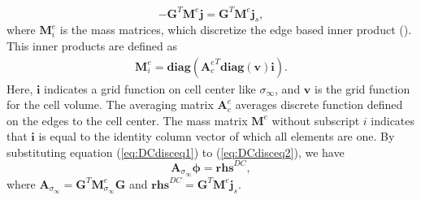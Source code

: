 \documentclass[a4paper, 11pt]{article}
\newcommand{\siginf}{\sigma_\infty}
\newcommand{\dgrad}{{\mathbf G}}
\newcommand{\Ace}{{\mathbf A_c^e}}
\newcommand{\diag}{\mathbf{diag}}
\newcommand{\M}{{\mathbf M}}
\newcommand{\MeSigInf}{{\M^e_{\sigma_\infty}}}
\newcommand{\Me}{{\M^e}}
\renewcommand {\dj}  { {\mathbf{j} } }
\newcommand{\vol}{\mathbf{v}}
\newcommand{\A}{\mathbf{A}}
\begin{document}
\begin{equation}
  -\dgrad^T \Me\dj = \dgrad^T \Me\dj_s,
  \label{eq:DCdisceq2}
\end{equation}
where $\mathbf{M}^e_i$ is the mass matrices, which discretize the edge based inner product (\cite{Eldadbook}). This inner products are defined  as
\begin{align}
  \mathbf{M}^e_i = \diag(\Ace^T\diag(\vol)\mathbf{i}).
\end{align}
Here, $\mathbf{i}$ indicates a grid function on cell center like $\siginf$, and $\vol$ is the grid function for the cell volume. The averaging matrix $\Ace$ averages discrete function defined on the edges to the cell center. The mass matrix $\Me$ without subscript $i$ indicates that $\mathbf{i}$ is equal to the identity column vector of which all elements are one. By substituting equation (\ref{eq:DCdisceq1}) to (\ref{eq:DCdisceq2}), we have
\begin{equation}
  \A_{\siginf}\boldsymbol{\phi} = \mathbf{rhs}^{DC},
  \label{eq:DCdiscLin}
\end{equation}
where $\A_{\siginf} = \dgrad^T \MeSigInf\dgrad$ and $\mathbf{rhs}^{DC} = \dgrad^T \Me\dj_s$. 

\end{document}

